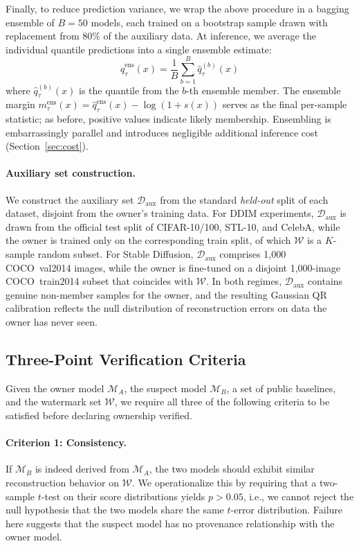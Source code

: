 \documentclass{article}
\newcommand{\Wset}{\ensuremath{\mathcal{W}}\xspace}
\begin{document}
Finally, to reduce prediction variance, we wrap the above procedure in a bagging ensemble of $B{=}50$ models, each trained on a bootstrap sample drawn with replacement from 80\% of the auxiliary data. At inference, we average the individual quantile predictions into a single ensemble estimate:
\begin{equation}
\hat{q}_\tau^{\text{ens}}(x) = \frac{1}{B}\sum_{b=1}^{B}\hat{q}_\tau^{(b)}(x)
\end{equation}
where $\hat{q}_\tau^{(b)}(x)$ is the quantile from the $b$-th ensemble member. The ensemble margin $m_\tau^{\text{ens}}(x) = \hat{q}_\tau^{\text{ens}}(x) - \log(1 + s(x))$ serves as the final per-sample statistic; as before, positive values indicate likely membership. Ensembling is embarrassingly parallel and introduces negligible additional inference cost (Section~\ref{sec:cost}).

\paragraph{Auxiliary set construction.}
We construct the auxiliary set $\mathcal{D}_{\text{aux}}$ from the standard
\emph{held-out} split of each dataset, disjoint from the owner's training data.
For DDIM experiments, $\mathcal{D}_{\text{aux}}$ is drawn from the official
test split of CIFAR-10/100, STL-10, and CelebA, while the owner is trained
only on the corresponding train split, of which $\mathcal{W}$ is a $K$-sample
random subset. For Stable Diffusion, $\mathcal{D}_{\text{aux}}$ comprises
1{,}000 COCO~val2014 images, while the owner is fine-tuned on a disjoint
1{,}000-image COCO~train2014 subset that coincides with $\mathcal{W}$.
In both regimes, $\mathcal{D}_{\text{aux}}$ contains genuine non-member samples
for the owner, and the resulting Gaussian QR calibration reflects the null
distribution of reconstruction errors on data the owner has never seen.

\subsection{Three-Point Verification Criteria}
\label{sec:criteria}

Given the owner model $\mathcal{M}_A$, the suspect model $\mathcal{M}_B$, a set of public baselines, and the watermark set $\Wset$, we require all three of the following criteria to be satisfied before declaring ownership verified.

\paragraph{Criterion 1: Consistency.}
If $\mathcal{M}_B$ is indeed derived from $\mathcal{M}_A$, the two models should exhibit similar reconstruction behavior on $\Wset$. We operationalize this by requiring that a two-sample $t$-test on their score distributions yields $p > 0.05$, i.e., we cannot reject the null hypothesis that the two models share the same $t$-error distribution. Failure here suggests that the suspect model has no provenance relationship with the owner model.
\end{document}
